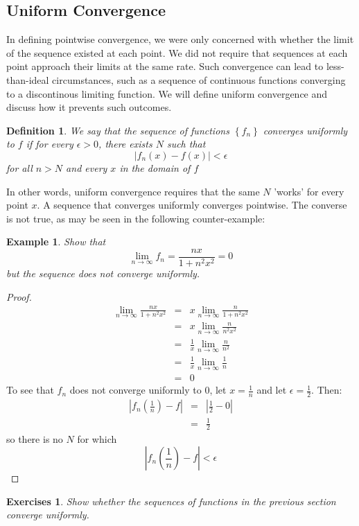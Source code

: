 \documentclass[12pt,a4paper]{article} %
\newtheorem{defn}{Definition}
\newtheorem{example}{Example}
\newtheorem{exer}{Exercises}
\begin{document}
\subsection{Uniform Convergence}
In defining pointwise convergence, we were only concerned with whether the limit of the sequence existed at each point.  We did not require that sequences at each point approach their limits at the same rate.  Such convergence can lead to less-than-ideal circumstances, such as a sequence of continuous functions converging to a discontinous limiting function. We will define uniform convergence and discuss how it prevents such outcomes.
\begin{defn}
We say that the sequence of functions $\left\{f_n\right\}$ \emph{converges uniformly} to $f$ if for every $\epsilon>0$, there exists $N$ such that
$$|f_n(x) -f(x)|<\epsilon$$ for all $n>N$ and \emph{every $x$ in the domain of $f$}
\end{defn} 
In other words, uniform convergence requires that the same $N$ 'works' for every point $x$.   A sequence that converges uniformly converges pointwise.  The converse is not true, as may be seen in the following counter-example:
\begin{example}
Show that $$\lim_{n\rightarrow\infty}f_n = \frac{nx}{1+n^2x^2}=0$$
but the sequence does not converge uniformly.
\end{example}
\begin{proof}
\begin{eqnarray}
 \lim_{n\rightarrow\infty}\frac{nx}{1+n^2x^2} &=& x\lim_{n\rightarrow\infty}\frac{n}{1+n^2x^2}\\
 &=& x\lim_{n\rightarrow\infty}\frac{n}{n^2x^2}\\
 &=&\frac1x\lim_{n\rightarrow\infty}\frac{n}{n^2}\\
 &=&\frac1x\lim_{n\rightarrow\infty}\frac{1}{n}\\
 &=&0
\end{eqnarray}
To see that $f_n$ does not converge uniformly to $0$, let $x=\frac1n$ and let $\epsilon = \frac12$.  Then:
\begin{eqnarray}
\left|f_n\left(\frac1n\right) - f\right| &=& \left|\frac{1}{2} - 0\right|\\
&=& \frac12
\end{eqnarray}
so there is no $N$ for which 
$$\left|f_n\left(\frac1n\right) - f\right|<\epsilon$$
\end{proof}
\begin{exer}
Show whether the sequences of functions in the previous section converge uniformly.
\end{exer}
\end{document}
